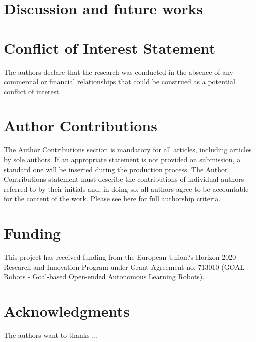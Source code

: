 \documentclass[utf8]{frontiersSCNS} %
\begin{document}
\section{Discussion and future works}
\label{sec:Discussion}


\section*{Conflict of Interest Statement}

The authors declare that the research was conducted in the absence of any commercial or financial relationships that could be construed as a potential conflict of interest.

\section*{Author Contributions}

The Author Contributions section is mandatory for all articles, including articles by sole authors. If an appropriate statement is not provided on submission, a standard one will be inserted during the production process. The Author Contributions statement must describe the contributions of individual authors referred to by their initials and, in doing so, all authors agree to be accountable for the content of the work. Please see  \href{http://home.frontiersin.org/about/author-guidelines#AuthorandContributors}{here} for full authorship criteria.

\section*{Funding}
This project has received funding from the European Union?s Horizon 2020 Research and Innovation Program under Grant Agreement no. 713010 (GOAL-Robots - Goal-based Open-ended Autonomous Learning Robots).

\section*{Acknowledgments}
The authors want to thanks ...


\end{document}
